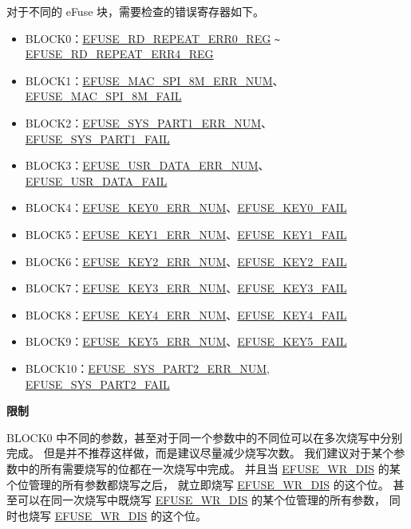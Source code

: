 \documentclass[main\_\_CN.tex]{subfiles}
\begin{document}
\begin{enumerate}
对于不同的 eFuse 块，需要检查的错误寄存器如下。
\begin{itemize}
    \item BLOCK0：\hyperref[regdesc:EFUSERDREPEATERR0REG]{EFUSE\_RD\_REPEAT\_ERR0\_REG} \verb+~+ \hyperref[regdesc:EFUSERDREPEATERR4REG]{EFUSE\_RD\_REPEAT\_ERR4\_REG}
    \item BLOCK1：\hyperref[fielddesc:EFUSEMACSPI8MERRNUM] {EFUSE\_MAC\_SPI\_8M\_ERR\_NUM}、\hyperref[fielddesc:EFUSEMACSPI8MFAIL] {EFUSE\_MAC\_SPI\_8M\_FAIL}
    \item BLOCK2：\hyperref[fielddesc:EFUSESYSPART1ERRNUM] {EFUSE\_SYS\_PART1\_ERR\_NUM}、\hyperref[fielddesc:EFUSESYSPART1FAIL] {EFUSE\_SYS\_PART1\_FAIL}
    \item BLOCK3：\hyperref[fielddesc:EFUSEUSRDATAERRNUM] {EFUSE\_USR\_DATA\_ERR\_NUM}、\hyperref[fielddesc:EFUSEUSRDATAFAIL] {EFUSE\_USR\_DATA\_FAIL}
    \item BLOCK4：\hyperref[fielddesc:EFUSEKEY0ERRNUM] {EFUSE\_KEY0\_ERR\_NUM}、\hyperref[fielddesc:EFUSEKEY0FAIL] {EFUSE\_KEY0\_FAIL}
    \item BLOCK5：\hyperref[fielddesc:EFUSEKEY1ERRNUM] {EFUSE\_KEY1\_ERR\_NUM}、\hyperref[fielddesc:EFUSEKEY1FAIL] {EFUSE\_KEY1\_FAIL}
    \item BLOCK6：\hyperref[fielddesc:EFUSEKEY2ERRNUM] {EFUSE\_KEY2\_ERR\_NUM}、\hyperref[fielddesc:EFUSEKEY2FAIL] {EFUSE\_KEY2\_FAIL}
    \item BLOCK7：\hyperref[fielddesc:EFUSEKEY3ERRNUM] {EFUSE\_KEY3\_ERR\_NUM}、\hyperref[fielddesc:EFUSEKEY3FAIL] {EFUSE\_KEY3\_FAIL}
    \item BLOCK8：\hyperref[fielddesc:EFUSEKEY4ERRNUM] {EFUSE\_KEY4\_ERR\_NUM}、\hyperref[fielddesc:EFUSEKEY4FAIL] {EFUSE\_KEY4\_FAIL}
    \item BLOCK9：\hyperref[fielddesc:EFUSEKEY5ERRNUM] {EFUSE\_KEY5\_ERR\_NUM}、\hyperref[fielddesc:EFUSEKEY5FAIL] {EFUSE\_KEY5\_FAIL}
    \item BLOCK10：\hyperref[fielddesc:EFUSESYSPART2ERRNUM] {EFUSE\_SYS\_PART2\_ERR\_NUM}, \hyperref[fielddesc:EFUSESYSPART2FAIL] {EFUSE\_SYS\_PART2\_FAIL}
\end{itemize}
\end{enumerate}


{\bfseries 限制}

BLOCK0 中不同的参数，甚至对于同一个参数中的不同位可以在多次烧写中分别完成。
但是并不推荐这样做，而是建议尽量减少烧写次数。
我们建议对于某个参数中的所有需要烧写的位都在一次烧写中完成。
并且当 \hyperref[fielddesc:EFUSEWRDIS]{EFUSE\_WR\_DIS} 的某个位管理的所有参数都烧写之后，
就立即烧写 \hyperref[fielddesc:EFUSEWRDIS]{EFUSE\_WR\_DIS} 的这个位。
甚至可以在同一次烧写中既烧写 \hyperref[fielddesc:EFUSEWRDIS]{EFUSE\_WR\_DIS} 的某个位管理的所有参数，
同时也烧写 \hyperref[fielddesc:EFUSEWRDIS]{EFUSE\_WR\_DIS} 的这个位。
\end{document}
